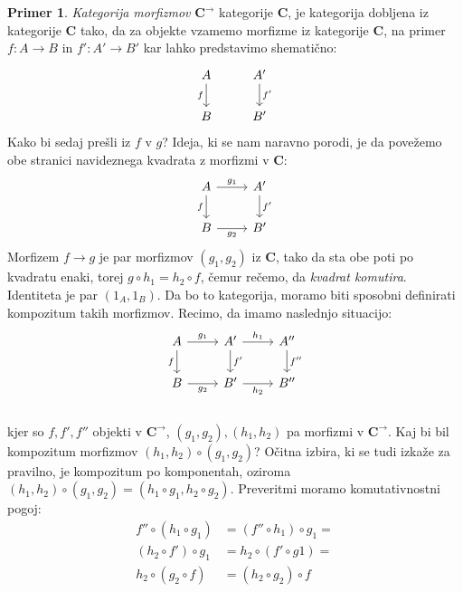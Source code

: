 \documentclass[12pt,a4paper]{book}
\theoremstyle{definition}
\theoremstyle{plain}
\theoremstyle{definition}
\newtheorem{primer}{Primer}[section]
\theoremstyle{remark}
\newcommand{\cat}[1]{\textbf{#1}}
\begin{document}
\begin{primer}
\emph{Kategorija morfizmov} $\cat{C}^{\rightarrow}$ kategorije $\cat{C}$, je kategorija dobljena iz kategorije $\cat{C}$ tako, da za objekte vzamemo morfizme iz kategorije $\cat{C}$, na primer $f : A \to B$ in $f' : A' \to B'$ kar lahko predstavimo shematično:
\[ \begin{tikzcd}
A \arrow[d, "f"'] & A' \arrow[d, "f'"] \\
B & B'
\end{tikzcd} \]
Kako bi sedaj prešli iz $f$ v $g$? Ideja, ki se nam naravno porodi, je da povežemo obe stranici navideznega kvadrata z morfizmi v $\cat{C}$:
\[ \begin{tikzcd}
A \arrow[d, "f"'] \arrow[r, "g_1"] & A' \arrow[d, "f'"] \\
B \arrow[r, "g_2"'] & B'
\end{tikzcd} \]
Morfizem $f \to g$ je par morfizmov $(g_1, g_2)$ iz $\cat{C}$, tako da sta obe poti po kvadratu enaki, torej $g \circ h_1 = h_2 \circ f$, čemur rečemo, da \emph{kvadrat komutira}.
Identiteta je par $(1_A, 1_B)$.
Da bo to kategorija, moramo biti sposobni definirati kompozitum takih morfizmov.
Recimo, da imamo naslednjo situacijo:
%
$$\begin{tikzcd}
A \arrow[d, "f"'] \arrow[r, "g_1"] & A' \arrow[d, "f'"] \arrow[r, "h_1"] & A'' \arrow[d, "f''"] \\
B \arrow[r, "g_2"'] & B' \arrow[r, "h_2"'] & B'' \\
\end{tikzcd}$$
%
kjer so $f, f', f''$ objekti v $\cat{C}^{\rightarrow}$, $(g_1, g_2), (h_1,h_2)$ pa morfizmi v $\cat{C}^{\rightarrow}$. Kaj bi bil kompozitum morfizmov $(h_1,h_2) \circ (g_1,g_2)$? Očitna izbira, ki se tudi izkaže za pravilno, je kompozitum po komponentah, oziroma $(h_1,h_2) \circ (g_1,g_2) = (h_1 \circ g_1, h_2 \circ g_2)$. Preveritmi moramo komutativnostni pogoj:
\begin{align*}
f'' \circ (h_1 \circ g_1) &= (f'' \circ h_1) \circ g_1 = \\
(h_2 \circ f') \circ g_1 &= h_2 \circ (f' \circ g1) = \\
h_2 \circ (g_2 \circ f) &= (h_2 \circ g_2) \circ f
\end{align*}

\end{primer}
\end{document}
